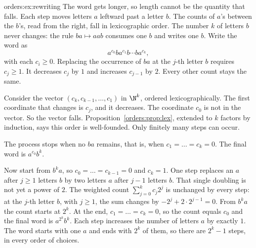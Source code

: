 \begin{solution}{orders:ex:rewriting}
\idea The word gets longer, so length cannot be the quantity that falls. Each step moves letters $a$ leftward past a letter $b$. The counts of $a$'s between the $b$'s, read from the right, fall in lexicographic order.
\writeup The number $k$ of letters $b$ never changes: the rule $ba\mapsto aab$ consumes one $b$ and writes one $b$. Write the word as
\[
a^{c_0}ba^{c_1}b\cdots ba^{c_k},
\]
with each $c_i\ge 0$. Replacing the occurrence of $ba$ at the $j$-th letter $b$ requires $c_j\ge 1$. It decreases $c_j$ by $1$ and increases $c_{j-1}$ by $2$. Every other count stays the same.

Consider the vector $(c_k,c_{k-1},\dots,c_1)$ in $\N^k$, ordered lexicographically. The first coordinate that changes is $c_j$, and it decreases. The coordinate $c_0$ is not in the vector. So the vector falls. Proposition~\ref{orders:prop:lex}, extended to $k$ factors by induction, says this order is well-founded. Only finitely many steps can occur.

The process stops when no $ba$ remains, that is, when $c_1=\dots=c_k=0$. The final word is $a^{c_0}b^k$.

Now start from $b^ka$, so $c_0=\dots=c_{k-1}=0$ and $c_k=1$. One step replaces an $a$ after $j\ge 1$ letters $b$ by two letters $a$ after $j-1$ letters $b$. That single doubling is not yet a power of $2$. The weighted count $\sum_{j=0}^k c_j 2^j$ is unchanged by every step: at the $j$-th letter $b$, with $j\ge 1$, the sum changes by $-2^j+2\cdot 2^{j-1}=0$. From $b^ka$ the count starts at $2^k$. At the end, $c_1=\dots=c_k=0$, so the count equals $c_0$ and the final word is $a^{2^k}b^k$. Each step increases the number of letters $a$ by exactly $1$. The word starts with one $a$ and ends with $2^k$ of them, so there are $2^k-1$ steps, in every order of choices.
\end{solution}

